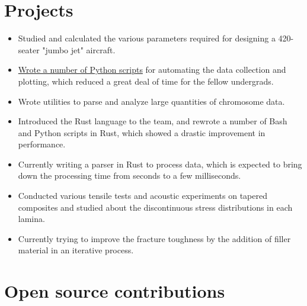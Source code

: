 \documentclass[11pt,a4paper,sans]{moderncv}        %
\newcommand\chref[3][linky]{\href{#2}{\color{#1}#3}}
\begin{document}
\section{Projects}
{\begin{itemize}
\item Studied and calculated the various parameters required for designing a 420-seater "jumbo jet" aircraft.
\item \chref{https://github.com/Wafflespeanut/scripts/tree/5610248de2d47311f128fecd015e2af8becca26f/python/Course}{Wrote a number of Python scripts} for automating the data collection and plotting, which reduced a great deal of time for the fellow undergrads.
\end{itemize}}
{\begin{itemize}
\item Wrote utilities to parse and analyze large quantities of chromosome data.
\item Introduced the Rust language to the team, and rewrote a number of Bash and Python scripts in Rust, which showed a drastic improvement in performance.
\item Currently writing a parser in Rust to process data, which is expected to bring down the processing time from seconds to a few milliseconds.
\end{itemize}}
{\begin{itemize}
\item Conducted various tensile tests and acoustic experiments on tapered composites and studied about the discontinuous stress distributions in each lamina.
\item Currently trying to improve the fracture toughness by the addition of filler material in an iterative process.
\end{itemize}}

\section{Open source contributions}
\end{document}
